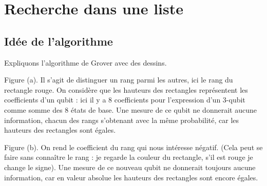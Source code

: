 \documentclass[11pt,class=report,crop=false]{standalone}
\begin{document}






\section{Recherche dans une liste}

\subsection{Idée de l'algorithme}

Expliquons l'algorithme de Grover avec des dessins. 


Figure (a). Il s'agit de distinguer un rang parmi les autres, ici le rang du rectangle rouge. On considère que les hauteurs des rectangles représentent les coefficients d'un qubit : ici il y a $8$ coefficients pour l'expression d'un $3$-qubit comme somme des $8$ états de base. Une mesure de ce qubit 
ne donnerait aucune information, chacun des rangs s'obtenant avec la même probabilité, car les hauteurs des rectangles sont égales.

\smallskip

Figure (b). On rend le coefficient du rang qui nous intéresse négatif. (Cela peut se faire sans connaître le rang : je regarde la couleur du rectangle, s'il est rouge je change le signe).
Une mesure de ce nouveau qubit ne donnerait toujours aucune information, car en valeur absolue les hauteurs des rectangles sont encore égales.
\end{document}
